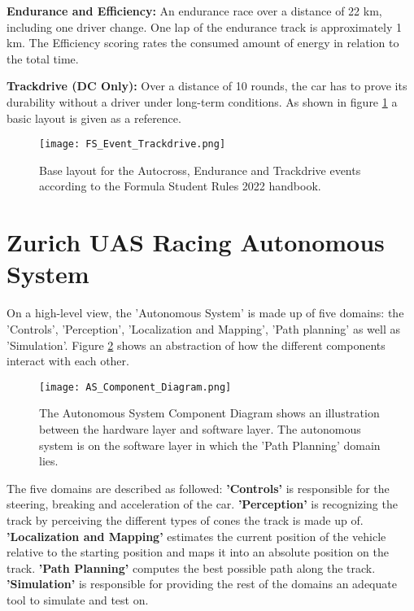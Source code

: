 \textbf{Endurance and Efficiency:} An endurance race over a distance of 22 km, including one driver change. One lap of the endurance track is approximately 1 km. The Efficiency scoring rates the consumed amount of energy in relation to the total time.

\textbf{Trackdrive (DC Only):}  Over a distance of 10 rounds, the car has to prove its durability without a driver under long-term conditions. As shown in figure \ref{fig:FS Autocross, Endurance and Trackdrive layout} a basic layout is given as a reference.
\begin{figure}[H]
    \centering
    \texttt{[image: FS\_Event\_Trackdrive.png]}
    \caption{Base layout for the Autocross, Endurance and Trackdrive events according to the Formula Student Rules 2022 handbook. \cite{fs_rules_2022_handbook}}
    \label{fig:FS Autocross, Endurance and Trackdrive layout}
\end{figure}

\section{Zurich UAS Racing Autonomous System} \label{sec:Zurich UAS Racing Autonomous System}
On a high-level view, the 'Autonomous System' is made up of five domains: the 'Controls', 'Perception', 'Localization and Mapping', 'Path planning' as well as 'Simulation'. Figure \ref{fig:AS Component Diagram} shows an abstraction of how the different components interact with each other.
\begin{figure}[H]
    \centering
    \texttt{[image: AS\_Component\_Diagram.png]}
    \caption{The Autonomous System Component Diagram shows an illustration between the hardware layer and software layer. The autonomous system is on the software layer in which the 'Path Planning' domain lies.}
    \label{fig:AS Component Diagram}
\end{figure}
The five domains are described as followed:
\textbf{'Controls'} is responsible for the steering, breaking and acceleration of the car.
\textbf{'Perception'} is recognizing the track by perceiving the different types of cones the track is made up of.
\textbf{'Localization and Mapping'} estimates the current position of the vehicle relative to the starting position and maps it into an absolute position on the track.
\textbf{'Path Planning'} computes the best possible path along the track.
\textbf{'Simulation'} is responsible for providing the rest of the domains an adequate tool to simulate and test on.


